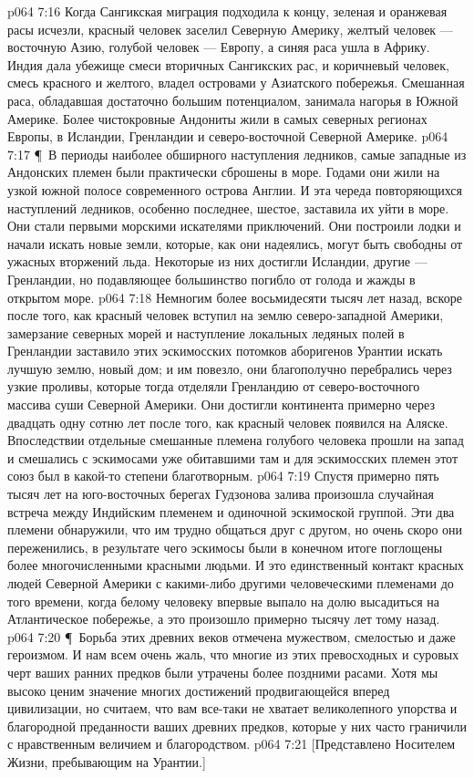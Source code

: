 \vs p064 7:16 Когда Сангикская миграция подходила к концу, зеленая и оранжевая расы исчезли, красный человек заселил Северную Америку, желтый человек --- восточную Азию, голубой человек --- Европу, а синяя раса ушла в Африку. Индия дала убежище смеси вторичных Сангикских рас, и коричневый человек, смесь красного и желтого, владел островами у Азиатского побережья. Смешанная раса, обладавшая достаточно большим потенциалом, занимала нагорья в Южной Америке. Более чистокровные Андониты жили в самых северных регионах Европы, в Исландии, Гренландии и северо\hyp{}восточной Северной Америке.
\vs p064 7:17 \P\ В периоды наиболее обширного наступления ледников, самые западные из Андонских племен были практически сброшены в море. Годами они жили на узкой южной полосе современного острова Англии. И эта череда повторяющихся наступлений ледников, особенно последнее, шестое, заставила их уйти в море. Они стали первыми морскими искателями приключений. Они построили лодки и начали искать новые земли, которые, как они надеялись, могут быть свободны от ужасных вторжений льда. Некоторые из них достигли Исландии, другие --- Гренландии, но подавляющее большинство погибло от голода и жажды в открытом море.
\vs p064 7:18 Немногим более восьмидесяти тысяч лет назад, вскоре после того, как красный человек вступил на землю северо\hyp{}западной Америки, замерзание северных морей и наступление локальных ледяных полей в Гренландии заставило этих эскимосских потомков аборигенов Урантии искать лучшую землю, новый дом; и им повезло, они благополучно перебрались через узкие проливы, которые тогда отделяли Гренландию от северо\hyp{}восточного массива суши Северной Америки. Они достигли континента примерно через двадцать одну сотню лет после того, как красный человек появился на Аляске. Впоследствии отдельные смешанные племена голубого человека прошли на запад и смешались с эскимосами уже обитавшими там и для эскимосских племен этот союз был в какой\hyp{}то степени благотворным.
\vs p064 7:19 Спустя примерно пять тысяч лет на юго\hyp{}восточных берегах Гудзонова залива произошла случайная встреча между Индийским племенем и одиночной эскимоской группой. Эти два племени обнаружили, что им трудно общаться друг с другом, но очень скоро они переженились, в результате чего эскимосы были в конечном итоге поглощены более многочисленными красными людьми. И это единственный контакт красных людей Северной Америки с какими\hyp{}либо другими человеческими племенами до того времени, когда белому человеку впервые выпало на долю высадиться на Атлантическое побережье, а это произошло примерно тысячу лет тому назад.
\vs p064 7:20 \P\ Борьба этих древних веков отмечена мужеством, смелостью и даже героизмом. И нам всем очень жаль, что многие из этих превосходных и суровых черт ваших ранних предков были утрачены более поздними расами. Хотя мы высоко ценим значение многих достижений продвигающейся вперед цивилизации, но считаем, что вам все\hyp{}таки не хватает великолепного упорства и благородной преданности ваших древних предков, которые у них часто граничили с нравственным величием и благородством.
\vs p064 7:21 [Представлено Носителем Жизни, пребывающим на Урантии.]
